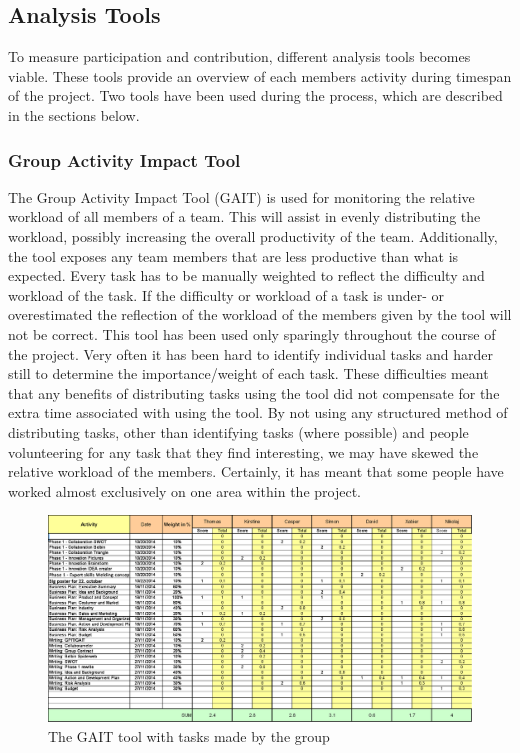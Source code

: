 \subsection{Analysis Tools}
To measure participation and contribution, different analysis tools becomes viable. These tools provide an overview of each members activity during timespan of the project. Two tools have been used during the process, which are described in the sections below.

\subsubsection{Group Activity Impact Tool}
 The Group Activity Impact Tool (GAIT) is used for monitoring the relative workload of all members of a team. This will assist in evenly distributing the workload, possibly increasing the overall productivity of the team. Additionally, the tool exposes any team members that are less productive than what is expected. Every task has to be manually weighted to reflect the difficulty and workload of the task. If the difficulty or workload of a task is under- or overestimated the reflection of the workload of the members given by the tool will not be correct.
This tool has been used only sparingly throughout the course of the project. Very often it has been hard to identify individual tasks and harder still to determine the importance/weight of each task. These difficulties meant that any benefits of distributing tasks using the tool did not compensate for the extra time associated with using the tool. 
 By not using any structured method of distributing tasks, other than identifying tasks (where possible) and people volunteering for any task that they find interesting, we may have skewed the relative workload of the members. Certainly, it has meant that some people have worked almost exclusively on one area within the project.

\begin{figure}[h!]
	\includegraphics[width=\textwidth]{./graphics/gait}
	\caption{The GAIT tool with tasks made by the group}
	\label{fig:GAIT}
\end{figure}

